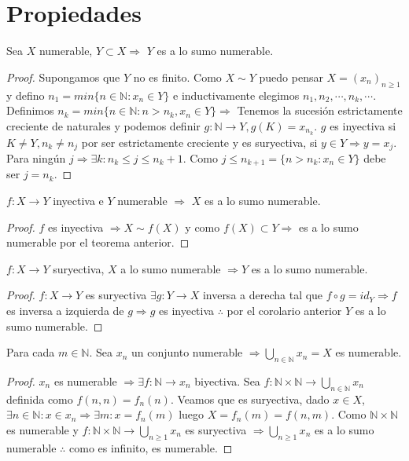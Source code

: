 \section{Propiedades}

\begin{theorem}
    Sea $X$ numerable, $Y \subset X \Rightarrow$ $Y$ es a lo sumo numerable.
    \begin{proof}
        Supongamos que $Y$ no es finito. Como $X \sim Y$ puedo pensar $X = (x_n)_{n\geq1}$ y defino $n_1=min\{ n \in \mathbb{N}: x_n \in Y \}$ e inductivamente elegimos $n_1, n_2, \cdots , n_k, \cdots$. Definimos $n_k = min\{ n \in \mathbb{N} : n > n_k, x_n \in Y \} \Rightarrow$ Tenemos la sucesión estrictamente creciente de naturales y podemos definir $g: \mathbb{N} \to Y, g(K) = x_{n_k}$. $g$ es inyectiva si $K\neq Y, n_k \neq n_j$ por ser estrictamente creciente y es suryectiva, si $y \in Y \Rightarrow y = x_j$. Para ningún $j \Rightarrow \exists k :n_k\leq j \leq n_k+1$. Como $j \leq n_{k+1}=\{ n>n_k:x_n \in Y \}$ debe ser $j = n_k$.
    \end{proof}
\end{theorem}

\begin{corollary}
    $f: X \to Y$ inyectiva e $Y$ numerable $\Rightarrow$ $X$ es a lo sumo numerable. 
    \begin{proof}
        $f$ es inyectiva $\Rightarrow X \sim f(X)$ y como $f(X) \subset Y \Rightarrow$ es a lo sumo numerable por el teorema anterior.
    \end{proof}
\end{corollary}

\begin{theorem}
    $f: X \to Y$ suryectiva, $X$ a lo sumo numerable $\Rightarrow Y$ es a lo sumo numerable.
    \begin{proof}
        $f: X \to Y$ es suryectiva $\exists g: Y \to X$ inversa a derecha tal que $f \circ g = id_Y \Rightarrow f$ es inversa a izquierda de $g \Rightarrow g$ es inyectiva $\therefore$ por el corolario anterior $Y$ es a lo sumo numerable.
    \end{proof}
\end{theorem}

\begin{theorem}
    Para cada $m \in \mathbb{N}$. Sea $x_n$ un conjunto numerable $\Rightarrow \bigcup_{n \in \mathbb{N}}x_n = X$ es numerable.
    \begin{proof}
        $x_n$ es numerable $\Rightarrow \exists f:\mathbb{N} \to x_n$ biyectiva. Sea $f:\mathbb{N} \times \mathbb{N} \to \bigcup_{n \in \mathbb{N}} x_n $ definida como $f(n, n) = f_n(n)$. Veamos que es suryectiva, dado $x \in X$, $\exists n \in \mathbb{N}:x \in x_n \Rightarrow \exists m:x=f_n(m)$ luego $X=f_n(m) = f(n, m)$. Como $\mathbb{N} \times \mathbb{N}$ es numerable y $f: \mathbb{N} \times \mathbb{N} \to \bigcup_{n \geq 1}{x_n}$ es suryectiva $\Rightarrow \bigcup_{n \geq 1}x_n$ es a lo sumo numerable $\therefore$ como es infinito, es numerable.
    \end{proof}
\end{theorem}

